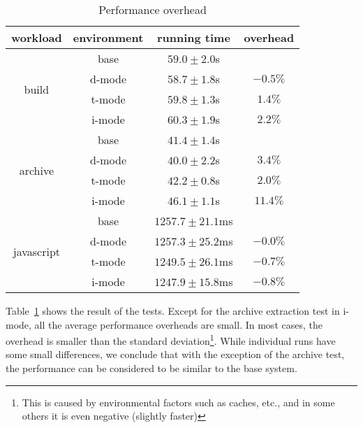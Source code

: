 
\begin{table}[tb]
\centering
\begin{tabular}{|c|c|c|c|}
\hline
workload & environment & running time & overhead \\ \hline
\multirow{4}{*}{build} &
  base   & $59.0\pm2.0$s & \\
& d-mode & $58.7\pm1.8$s & $-0.5\%$ \\
& t-mode & $59.8\pm1.3$s & $1.4\%$ \\
& i-mode & $60.3\pm1.9$s & $2.2\%$ \\ \hline
\multirow{4}{*}{archive} &
  base   & $41.4\pm1.4$s & \\
& d-mode & $40.0\pm2.2$s & $3.4\%$ \\
& t-mode & $42.2\pm0.8$s & $2.0\%$ \\
& i-mode & $46.1\pm1.1$s & $11.4\%$ \\ \hline
\multirow{4}{*}{javascript} &
  base   & $1257.7\pm21.1$ms & \\
& d-mode & $1257.3\pm25.2$ms & $-0.0\%$ \\
& t-mode & $1249.5\pm26.1$ms & $-0.7\%$ \\
& i-mode & $1247.9\pm15.8$ms & $-0.8\%$ \\ \hline
\end{tabular}
\caption{Performance overhead}
\label{table:binint-benchmark}
\end{table}

Table~\ref{table:binint-benchmark} shows the result of the tests.
Except for the archive extraction test in i-mode,
all the average performance overheads are small.
In most cases, the overhead is smaller than the standard deviation\footnote{
This is caused by environmental factors such as caches, etc., and in some
others it is even negative (slightly faster)}.
While individual runs have some small differences, we conclude that
with the exception of the archive test, the performance can be considered to
be similar to the base system.

